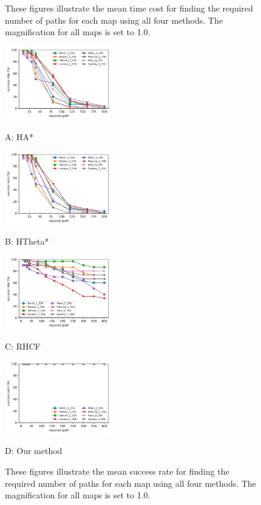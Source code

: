 \documentclass[lettersize,journal]{IEEEtran}
\begin{document}
\begin{figure}[t]
\caption{These figures illustrate the mean time cost for finding the required number of paths for each map using all four methods. The magnification for all maps is set to 1.0.}
\label{total_time_cost_and_path_count}
\end{figure}

\begin{figure}[t] \scriptsize
\begin{minipage}{.245\linewidth}
  \centerline{\includegraphics[width=4.6cm]{HsAs_succ_and_count.png}}
  \centerline{A: HA*}
\end{minipage}
\hfill
\begin{minipage}{.245\linewidth}
  \centerline{\includegraphics[width=4.6cm]{HsTs_succ_and_count.png}}
  \centerline{B: HTheta*}
\end{minipage}
\hfill
\begin{minipage}{.245\linewidth}
  \centerline{\includegraphics[width=4.6cm]{RHCF_succ_and_count.png}}
  \centerline{C: RHCF}
\end{minipage}
\hfill
\begin{minipage}{.245\linewidth}
  \centerline{\includegraphics[width=4.6cm]{RJ_succ_and_count.png}}
  \centerline{D: Our method}
\end{minipage}
\vfill

\caption{These figures illustrate the mean success rate for finding the required number of paths for each map using all four methods. The magnification for all maps is set to 1.0. 
}
\label{succ_and_path_count}
\end{figure}
\end{document}
